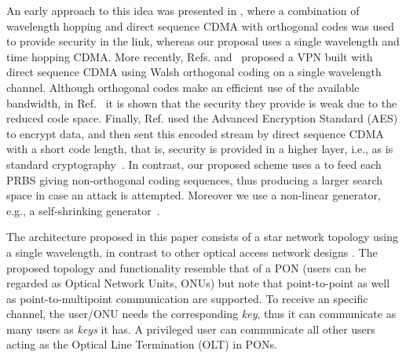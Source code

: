 \documentclass[10pt]{article}
\begin{document}
An early approach to this idea was presented in \cite{Tancevski:95},
where a combination of wavelength hopping and direct sequence CDMA
with orthogonal codes was used to provide security in the link, whereas our proposal uses a single wavelength and time hopping CDMA.
More recently, Refs. \cite{Nadarajah2006} and~\cite{Nirmalathas2009} proposed a VPN built with direct sequence CDMA using Walsh orthogonal coding on a single wavelength channel.
Although orthogonal codes make an efficient use of the available
bandwidth, in Ref.~\cite{Shake:05} it is shown that the security they
provide is weak due to the reduced code space.
Finally, Ref. \cite{Wang:10} used the Advanced Encryption Standard (AES)
to encrypt data, and then sent this encoded stream by direct sequence CDMA with
a short code length, that is, security is provided in a higher
layer, i.e., as is standard cryptography~\cite{Shake:05}.
In contrast, our proposed scheme uses a  to feed each PRBS giving
 non-orthogonal coding sequences, thus producing a larger search space
in case an attack is attempted. Moreover we use a non-linear generator,
e.g., a self-shrinking generator~\cite{Meier:94}.


The architecture proposed in this paper consists of a star network
topology using a single wavelength, in contrast to other optical access network designs \cite{journals/jsac/CarenaFFGNPP04}.
The proposed topology and functionality resemble that of a PON (users
can be regarded as Optical Network Units, ONUs) but note that
point-to-point as well as point-to-multipoint communication are
supported. 
To receive an specific channel, the user/ONU needs the corresponding
{\em key}, thus it can communicate as many users as {\em keys} it has.
A privileged user can communicate all other users acting as the Optical Line Termination (OLT) in PONs.
\end{document}
